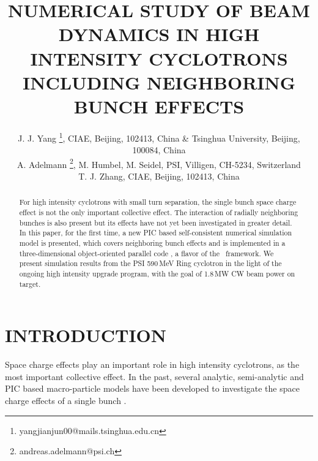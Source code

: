 \documentclass{JAC2003}
\begin{document}
\title{NUMERICAL STUDY OF BEAM DYNAMICS IN HIGH INTENSITY CYCLOTRONS INCLUDING NEIGHBORING BUNCH EFFECTS}

\author{J. J. Yang \thanks{yangjianjun00@mails.tsinghua.edu.cn}, 
  CIAE, Beijing, 102413, China \&
  Tsinghua University, Beijing, 100084, China\\
  A. Adelmann \thanks{andreas.adelmann@psi.ch},
  M. Humbel,
  M. Seidel,
  PSI, Villigen, CH-5234, Switzerland\\
  T. J. Zhang, 
  CIAE, Beijing, 102413, China\\}


\maketitle

\begin{abstract}
  For high intensity cyclotrons with small turn separation, the single bunch space charge effect is not the only important collective effect. 
  The interaction of radially neighboring bunches is also present but its effects have not yet been investigated in greater detail.
  In this paper, for the first time, a new PIC based self-consistent numerical simulation model is presented, 
  which covers neighboring bunch effects and is implemented in a three-dimensional object-oriented parallel code \opalcycl,
  a flavor of the \opal \  framework. 
  We present simulation results from the PSI 590\,MeV Ring cyclotron in the light of the ongoing high intensity upgrade program,
  with the goal of 1.8\,MW CW beam power on target.
\end{abstract}

\section{INTRODUCTION \label{intro}}


Space charge effects play an important role in high intensity cyclotrons, as the most important collective effect. 
In the past, several analytic, semi-analytic and PIC based macro-particle models have been developed to investigate the space charge effects of a single bunch \cite{Gordon:1,Joho:1,Adam:1,Adam:2,Ada:1}. 
\end{document}
